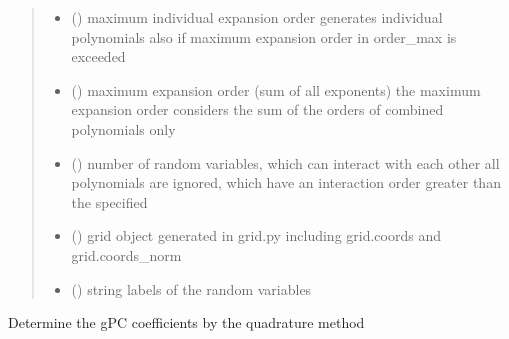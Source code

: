 \documentclass[letterpaper,10pt,english,openany,oneside]{sphinxmanual}
\begin{document}
\begin{fulllineitems}
\begin{quote}
\begin{description}
\begin{itemize}
\item {} 
 (\sphinxstyleliteralemphasis{\sphinxupquote{{[}}}\sphinxstyleliteralemphasis{\sphinxupquote{{]} }}) \textendash{} maximum individual expansion order
generates individual polynomials also if maximum expansion order in order\_max is exceeded

\item {} 
 () \textendash{} maximum expansion order (sum of all exponents)
the maximum expansion order considers the sum of the orders of combined polynomials only

\item {} 
 () \textendash{} number of random variables, which can interact with each other
all polynomials are ignored, which have an interaction order greater than the specified

\item {} 
 () \textendash{} grid object generated in grid.py including grid.coords and grid.coords\_norm

\item {} 
 (\sphinxstyleliteralemphasis{\sphinxupquote{{[}}}\sphinxstyleliteralemphasis{\sphinxupquote{{]} }}\sphinxstyleliteralemphasis{\sphinxupquote{, }}\sphinxstyleliteralemphasis{\sphinxupquote{, }}) \textendash{} string labels of the random variables

\end{itemize}

\end{description}\end{quote}

\begin{fulllineitems}
\label{\detokenize{pygpc:pygpc.quad.Quad.get_coeffs_expand}}
Determine the gPC coefficients by the quadrature method


\end{fulllineitems}
\end{fulllineitems}
\end{document}
